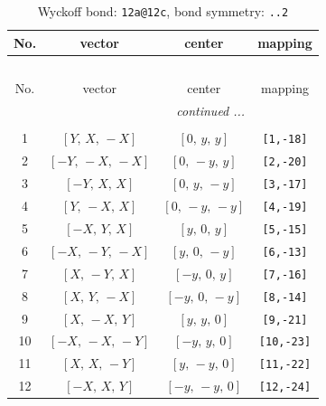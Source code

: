 \documentclass[fleqn,8pt]{jsarticle}
\begin{document}
\begin{longtable}{cccc}
\caption{Wyckoff bond: {\tt 12a@12c}, bond symmetry: {\tt ..2}}
 \\
 \hline \hline
No. & vector & center & mapping \\ \hline \endfirsthead

\multicolumn{3}{l}{\tablename\ \thetable{}} \\
 \hline \hline
No. & vector & center & mapping \\ \hline \endhead

 \hline \hline
\multicolumn{3}{r}{\footnotesize\it continued ...} \\ \endfoot

 \hline \hline
\multicolumn{3}{r}{} \\ \endlastfoot

1 & $\left[ Y,\, X,\, - X \right]$ & $\left[ 0,\, y,\, y \right]$ & {\tt [1,-18]} \\ \hline
2 & $\left[ - Y,\, - X,\, - X \right]$ & $\left[ 0,\, - y,\, y \right]$ & {\tt [2,-20]} \\ \hline
3 & $\left[ - Y,\, X,\, X \right]$ & $\left[ 0,\, y,\, - y \right]$ & {\tt [3,-17]} \\ \hline
4 & $\left[ Y,\, - X,\, X \right]$ & $\left[ 0,\, - y,\, - y \right]$ & {\tt [4,-19]} \\ \hline
5 & $\left[ - X,\, Y,\, X \right]$ & $\left[ y,\, 0,\, y \right]$ & {\tt [5,-15]} \\ \hline
6 & $\left[ - X,\, - Y,\, - X \right]$ & $\left[ y,\, 0,\, - y \right]$ & {\tt [6,-13]} \\ \hline
7 & $\left[ X,\, - Y,\, X \right]$ & $\left[ - y,\, 0,\, y \right]$ & {\tt [7,-16]} \\ \hline
8 & $\left[ X,\, Y,\, - X \right]$ & $\left[ - y,\, 0,\, - y \right]$ & {\tt [8,-14]} \\ \hline
9 & $\left[ X,\, - X,\, Y \right]$ & $\left[ y,\, y,\, 0 \right]$ & {\tt [9,-21]} \\ \hline
10 & $\left[ - X,\, - X,\, - Y \right]$ & $\left[ - y,\, y,\, 0 \right]$ & {\tt [10,-23]} \\ \hline
11 & $\left[ X,\, X,\, - Y \right]$ & $\left[ y,\, - y,\, 0 \right]$ & {\tt [11,-22]} \\ \hline
12 & $\left[ - X,\, X,\, Y \right]$ & $\left[ - y,\, - y,\, 0 \right]$ & {\tt [12,-24]} \\
\end{longtable}
\renewcommand{\arraystretch}{1.2}
\end{document}
